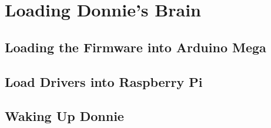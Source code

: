 \chapter{Loading Donnie's Brain}

\section{Loading the Firmware into Arduino Mega}
\label{sec:load_mega}

\section{Load Drivers into Raspberry Pi}
\label{sec:load_pri}


\section{Waking Up Donnie}
\label{sec:wake_up}


